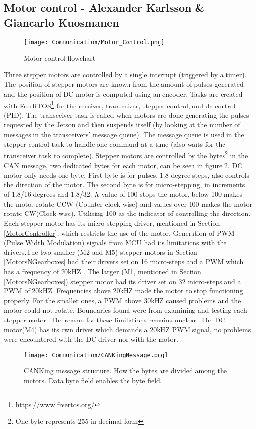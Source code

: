 \subsection{Motor control - Alexander Karlsson \& Giancarlo Kuosmanen}
\label{motorcancontrol}
\begin{figure}[!ht]
\centering
\texttt{[image: Communication/Motor\_Control.png]}
\caption{Motor control flowchart.}
\label{fig:Motor_Control}
\end{figure}
Three stepper motors are controlled by a single interrupt (triggered by a timer). The position of stepper motors are known from the amount of pulses generated and the position of DC motor is computed using an encoder. Tasks are created with FreeRTOS\footnote{\url{https://www.freertos.org/}} for the receiver, transceiver, stepper control, and dc control (PID). The transceiver task is called when motors are done generating the pulses requested by the Jetson and then suspends itself (by looking at the number of messages in the transceivers' message queue). The message queue is used in the stepper control task to handle one command at a time (also waits for the transceiver task to complete).
\newline
\indent Stepper motors are controlled by the bytes\footnote{One byte represents 255 in decimal form} in the CAN message, two dedicated bytes for each motor, can be seen in figure \ref{fig:CANKingMessage}. DC motor only needs one byte. First byte is for pulses, 1.8 degree steps, also controls the direction of the motor. The  second byte is for micro-stepping, in increments of 1.8/16 degrees and 1.8/32. %
A value of 100 stops the motor, below 100 makes the motor rotate CCW (Counter clock wise) and values over 100 makes the motor rotate CW(Clock-wise). Utilising 100 as the indicator of controlling the direction. \newline \indent Each stepper motor has its micro-stepping driver, mentioned in Section \ref{MotorController}, which restricts the use of the motor. Generation of PWM (Pulse Width Modulation) signals from MCU had its limitations with the drivers.\newline \indent The two smaller (M2 and M5) stepper motors in Section \ref{MotorsNGearboxes} had their drivers set on 16 micro-steps and a PWM which has a frequency of 20kHZ . The larger (M1, mentioned in Section \ref{MotorsNGearboxes}) stepper motor had its driver set on 32 micro-steps and a PWM of 20kHZ. Frequencies above 20kHZ made the motor to stop functioning properly. For the smaller ones, a PWM above 30kHZ caused problems and the motor could not rotate. \newline 
\indent Boundaries found were from examining and testing each stepper motor. The reason for these limitations remains unclear. The DC motor(M4) has its own driver which demands a 20kHZ PWM signal, no problems were encountered with the DC driver nor with the motor.  
\begin{figure}[!ht]
\centering
\texttt{[image: Communication/CANKingMessage.png]}
\caption{CANKing message structure. How the bytes are divided among the motors. Data byte field enables the byte field.}
\label{fig:CANKingMessage}
\end{figure}
